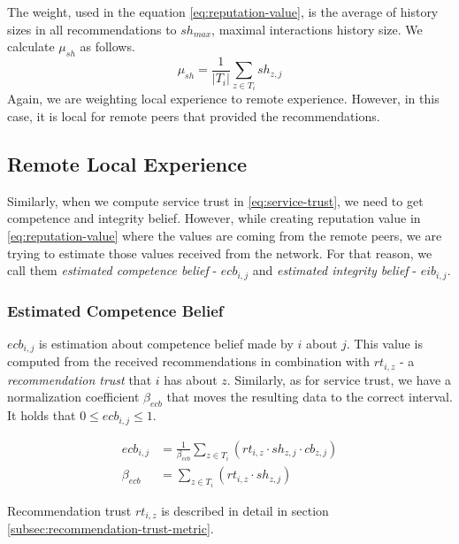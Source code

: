 \noindent
The weight, used in the equation \ref{eq:reputation-value}, is the average of history sizes in all recommendations to $sh_{max}$, maximal interactions history size. 
We calculate $\mu_{sh}$ as follows.
\begin{equation}
    \mu_{sh} = \frac{1}{|T_{i}|} \sum_{z \in T_{i}} sh_{z, j}
\end{equation}
\noindent
Again, we are weighting local experience to remote experience. However, in this case, it is local for remote peers that provided the recommendations.

\subsection{Remote Local Experience}
\label{subsec:remote-local-experience}
Similarly, when we compute service trust in \ref{eq:service-trust}, we need to get competence and integrity belief.
However, while creating reputation value in \ref{eq:reputation-value} where the values are coming from the remote peers, we are trying to estimate those values received from the network.
For that reason, we call them \textit{estimated competence belief} - $ecb_{i,j}$ and \textit{estimated integrity belief} - $eib_{i,j}$.

\subsubsection{Estimated Competence Belief}
$ecb_{i,j}$ is estimation about competence belief made by $i$ about $j$. 
This value is computed from the received recommendations in combination with $rt_{i,z}$ - a \textit{recommendation trust} that $i$ has about $z$.
Similarly, as for service trust, we have a normalization coefficient $\beta_{ecb}$ that moves the resulting data to the correct interval.
It holds that $0 \leq ecb_{i,j} \leq 1$.

\begin{equation}
\label{eq:estimated-competence-belief}
\begin{split}
    ecb_{i,j} &= \frac{1}{\beta_{ecb}} \sum_{z \in T_{i}} \left(rt_{i, z} \cdot sh_{z, j} \cdot cb_{z, j}\right) \\
    \beta_{ecb} &= \sum_{z \in T_{i}} \left(rt_{i, z} \cdot sh_{z, j}\right)
\end{split}
\end{equation}

\noindent
Recommendation trust $rt_{i, z}$ is described in detail in section \ref{subsec:recommendation-trust-metric}.

